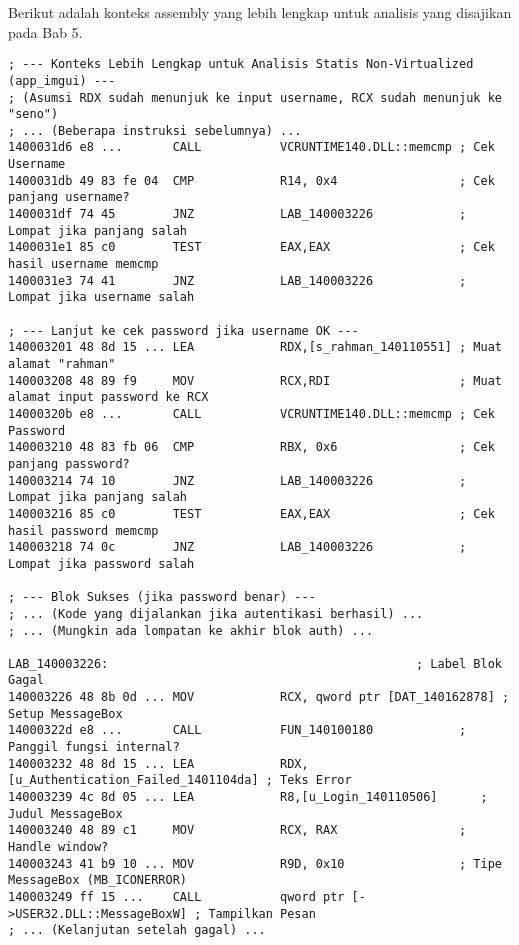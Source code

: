 Berikut adalah konteks assembly yang lebih lengkap untuk analisis yang disajikan pada Bab 5.

\begin{verbatim}
; --- Konteks Lebih Lengkap untuk Analisis Statis Non-Virtualized (app_imgui) ---
; (Asumsi RDX sudah menunjuk ke input username, RCX sudah menunjuk ke "seno")
; ... (Beberapa instruksi sebelumnya) ...
1400031d6 e8 ...       CALL           VCRUNTIME140.DLL::memcmp ; Cek Username
1400031db 49 83 fe 04  CMP            R14, 0x4                 ; Cek panjang username?
1400031df 74 45        JNZ            LAB_140003226            ; Lompat jika panjang salah
1400031e1 85 c0        TEST           EAX,EAX                  ; Cek hasil username memcmp
1400031e3 74 41        JNZ            LAB_140003226            ; Lompat jika username salah

; --- Lanjut ke cek password jika username OK ---
140003201 48 8d 15 ... LEA            RDX,[s_rahman_140110551] ; Muat alamat "rahman"
140003208 48 89 f9     MOV            RCX,RDI                  ; Muat alamat input password ke RCX
14000320b e8 ...       CALL           VCRUNTIME140.DLL::memcmp ; Cek Password
140003210 48 83 fb 06  CMP            RBX, 0x6                 ; Cek panjang password?
140003214 74 10        JNZ            LAB_140003226            ; Lompat jika panjang salah
140003216 85 c0        TEST           EAX,EAX                  ; Cek hasil password memcmp
140003218 74 0c        JNZ            LAB_140003226            ; Lompat jika password salah

; --- Blok Sukses (jika password benar) ---
; ... (Kode yang dijalankan jika autentikasi berhasil) ...
; ... (Mungkin ada lompatan ke akhir blok auth) ...

LAB_140003226:                                           ; Label Blok Gagal
140003226 48 8b 0d ... MOV            RCX, qword ptr [DAT_140162878] ; Setup MessageBox
14000322d e8 ...       CALL           FUN_140100180            ; Panggil fungsi internal?
140003232 48 8d 15 ... LEA            RDX,[u_Authentication_Failed_1401104da] ; Teks Error
140003239 4c 8d 05 ... LEA            R8,[u_Login_140110506]      ; Judul MessageBox
140003240 48 89 c1     MOV            RCX, RAX                 ; Handle window?
140003243 41 b9 10 ... MOV            R9D, 0x10                ; Tipe MessageBox (MB_ICONERROR)
140003249 ff 15 ...    CALL           qword ptr [->USER32.DLL::MessageBoxW] ; Tampilkan Pesan
; ... (Kelanjutan setelah gagal) ...
    \end{verbatim}
\label{lst:asm_static_nonvirt_full}

